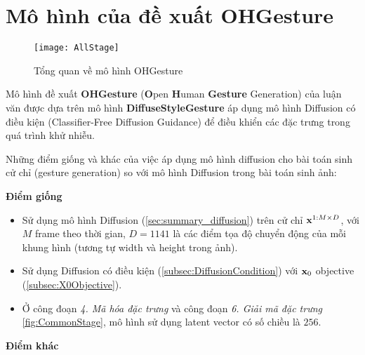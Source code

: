 \pagebreak

\section{Mô hình của đề xuất OHGesture}
\label{sec:ohgesture}

\begin{figure}[H]
	\centering
		\texttt{[image: AllStage]}
	\caption{Tổng quan về mô hình OHGesture}
	\label{fig:TrainingAndSampling}
\end{figure}

Mô hình đề xuất \textbf{OHGesture} (\textbf{O}pen \textbf{H}uman \textbf{Gesture} Generation) của luận văn được dựa trên mô hình \textbf{DiffuseStyleGesture} \cite{yang2023diffusestylegesture} áp dụng mô hình Diffusion \cite{ho2020denoising} có điều kiện \cite{ho2022classifier} (Classifier-Free Diffusion Guidance) để điều khiển các đặc trưng trong quá trình khử nhiễu.

Những điểm giống và khác của việc áp dụng mô hình diffusion cho bài toán sinh cử chỉ (gesture generation) so với mô hình Diffusion trong bài toán sinh ảnh:

\vspace{10pt}

\textbf{Điểm giống}
\begin{itemize}
	\item Sử dụng mô hình Diffusion (\autoref{sec:summary_diffusion}) trên cử chỉ $\mathbf{x}^{1:M \times D}$,  với $M$ frame theo thời gian, $D=1141$ là các điểm tọa độ chuyển động của mỗi khung hình (tương tự width và height trong ảnh).
	\item Sử dụng Diffusion có điều kiện (\autoref{subsec:DiffusionCondition}) với $\mathbf{x}_0$ objective (\autoref{subsec:X0Objective}).
	\item Ở công đoạn \textit{4. Mã hóa đặc trưng} và công đoạn \textit{6. Giải mã đặc trưng} \autoref{fig:CommonStage}, mô hình sử dụng latent vector có số chiều là $256$.
\end{itemize}

\textbf{Điểm khác}


